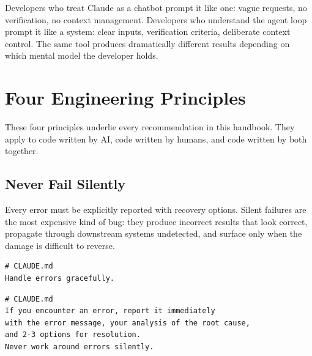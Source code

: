 \begin{whybox}
Developers who treat Claude as a chatbot prompt it like one:
vague requests, no verification, no context management.
Developers who understand the agent loop prompt it like a system:
clear inputs, verification criteria, deliberate context control.
The same tool produces dramatically different results depending
on which mental model the developer holds.
\end{whybox}

\section{Four Engineering Principles}
\label{sec:four-principles}

These four principles underlie every recommendation in this handbook.
They apply to code written by AI, code written by humans,
and code written by both together.

\subsection{Never Fail Silently}

Every error must be explicitly reported with recovery options.
Silent failures are the most expensive kind of bug:
they produce incorrect results that look correct,
propagate through downstream systems undetected,
and surface only when the damage is difficult to reverse.

\begin{fullwidth}
\begin{beforeafter}
\before
\begin{verbatim}
# CLAUDE.md
Handle errors gracefully.
\end{verbatim}

\after
\begin{verbatim}
# CLAUDE.md
If you encounter an error, report it immediately
with the error message, your analysis of the root cause,
and 2-3 options for resolution.
Never work around errors silently.
\end{verbatim}
\end{beforeafter}
\end{fullwidth}


